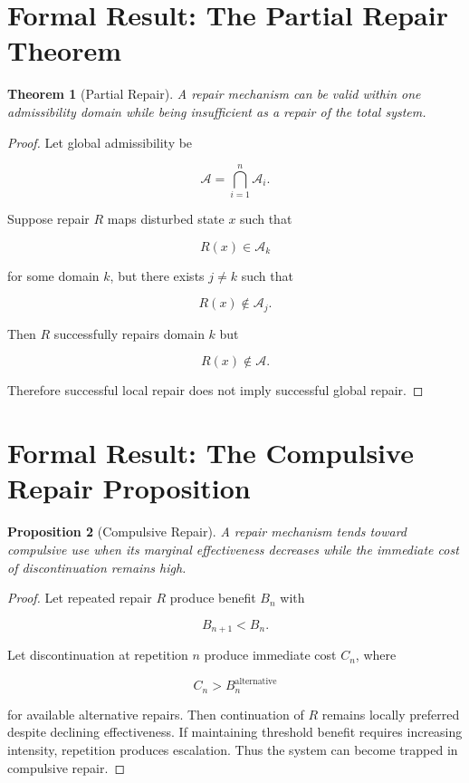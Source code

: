 \documentclass[11pt,oneside]{book}
\newtheorem{theorem}{Theorem}[chapter]
\newtheorem{proposition}[theorem]{Proposition}
\theoremstyle{definition}
\theoremstyle{remark}
\newcommand{\A}{\mathcal{A}}
\begin{document}
\section{Formal Result: The Partial Repair Theorem}

\begin{theorem}[Partial Repair]
A repair mechanism can be valid within one admissibility domain while being insufficient as a repair of the total system.
\end{theorem}

\begin{proof}
Let global admissibility be

\[
\A
=
\bigcap_{i=1}^{n}\A_i.
\]

Suppose repair \(R\) maps disturbed state \(x\) such that

\[
R(x)\in\A_k
\]

for some domain \(k\), but there exists \(j\neq k\) such that

\[
R(x)\notin\A_j.
\]

Then \(R\) successfully repairs domain \(k\) but

\[
R(x)\notin\A.
\]

Therefore successful local repair does not imply successful global repair.
\end{proof}

\section{Formal Result: The Compulsive Repair Proposition}

\begin{proposition}[Compulsive Repair]
A repair mechanism tends toward compulsive use when its marginal effectiveness decreases while the immediate cost of discontinuation remains high.
\end{proposition}

\begin{proof}
Let repeated repair \(R\) produce benefit \(B_n\) with

\[
B_{n+1}<B_n.
\]

Let discontinuation at repetition \(n\) produce immediate cost \(C_n\), where

\[
C_n>B_n^{\mathrm{alternative}}
\]

for available alternative repairs. Then continuation of \(R\) remains locally preferred despite declining effectiveness. If maintaining threshold benefit requires increasing intensity, repetition produces escalation. Thus the system can become trapped in compulsive repair.
\end{proof}
\end{document}
